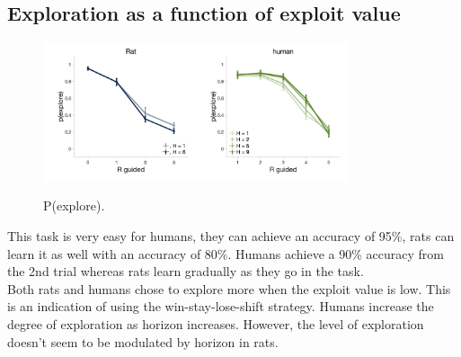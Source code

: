 \documentclass[12pt]{article}
\begin{document}
\subsection*{Exploration as a function of exploit value}
\begin{figure}[H]
	\begin{center}
			\includegraphics[width=0.4\textwidth]{figs/RatEE_Free_pexplore.png}\includegraphics[width=0.4\textwidth]{figs/OneshotHuman_pexplore.png}
			\caption{P(explore).}
	\end{center}
\end{figure}

This task is very easy for humans, they can achieve an accuracy of 95\%, rats can learn  it as well with an accuracy of 80\%. Humans achieve a 90\% accuracy from the 2nd trial whereas rats learn gradually as they go in the task.\\

Both rats and humans chose to explore more when the exploit value is low. This is an indication of using the win-stay-lose-shift strategy. Humans increase the degree of exploration as horizon increases. However, the level of exploration doesn't seem to be modulated by horizon in rats. 



\end{document}
